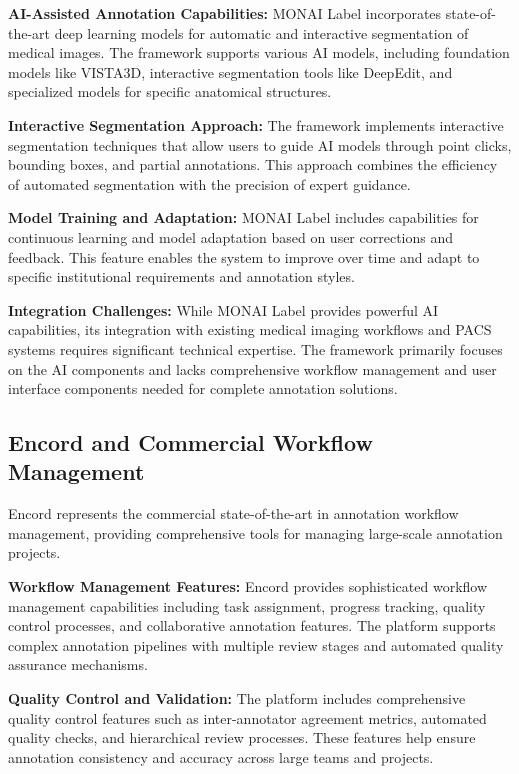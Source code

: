 \textbf{AI-Assisted Annotation Capabilities:} MONAI Label incorporates state-of-the-art deep learning models for automatic and interactive segmentation of medical images. The framework supports various AI models, including foundation models like VISTA3D, interactive segmentation tools like DeepEdit, and specialized models for specific anatomical structures.

\textbf{Interactive Segmentation Approach:} The framework implements interactive segmentation techniques that allow users to guide AI models through point clicks, bounding boxes, and partial annotations. This approach combines the efficiency of automated segmentation with the precision of expert guidance.

\textbf{Model Training and Adaptation:} MONAI Label includes capabilities for continuous learning and model adaptation based on user corrections and feedback. This feature enables the system to improve over time and adapt to specific institutional requirements and annotation styles.

\textbf{Integration Challenges:} While MONAI Label provides powerful AI capabilities, its integration with existing medical imaging workflows and PACS systems requires significant technical expertise. The framework primarily focuses on the AI components and lacks comprehensive workflow management and user interface components needed for complete annotation solutions.

\subsection{Encord and Commercial Workflow Management}

Encord represents the commercial state-of-the-art in annotation workflow management, providing comprehensive tools for managing large-scale annotation projects.

\textbf{Workflow Management Features:} Encord provides sophisticated workflow management capabilities including task assignment, progress tracking, quality control processes, and collaborative annotation features. The platform supports complex annotation pipelines with multiple review stages and automated quality assurance mechanisms.

\textbf{Quality Control and Validation:} The platform includes comprehensive quality control features such as inter-annotator agreement metrics, automated quality checks, and hierarchical review processes. These features help ensure annotation consistency and accuracy across large teams and projects.

